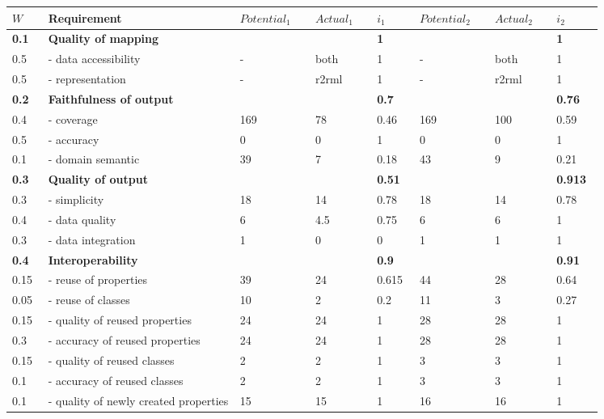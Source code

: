 \documentclass[PhD, Submit, ngerman,UKenglish,table]{scrbook}
\begin{document}
\begin{table}[!ht]
\centering
\setlength{\tabcolsep}{4pt}
\begin{tabular}{p{0.05\linewidth}|p{0.28\linewidth}|p{0.11\linewidth}|p{0.09\linewidth}|p{0.06\linewidth}|p{0.11\linewidth}|p{0.09\linewidth}|p{0.06\linewidth}}

\textbf{$W$}  &\textbf{Requirement} & \textbf{$Potential_1$} & \textbf{$Actual_1$} & \textbf{$i_1$} & \textbf{$Potential_2$} & \textbf{$Actual_2$} & \textbf{$i_2$} \\
\toprule

\rowcolor[gray]{.9}
\textbf{0.1} & \multicolumn{3}{l|}{\textbf{Quality of mapping}} &\textbf{1} & & & \textbf{1}\\

0.5 & - data accessibility & - & both & 1  & - & both & 1  \\
0.5 & - representation & - & \gls{r2rml} & 1  & - & \gls{r2rml} & 1 \\

\rowcolor[gray]{.9}
\textbf{0.2} & \multicolumn{3}{l|}{\textbf{Faithfulness of output}} &  \textbf{0.7}  & & & \textbf{0.76} \\

0.4 & \colorbox{gray!50}{- coverage} & 169 & 78 & \colorbox{gray!50}{0.46}  & 169 & 100 & 0.59 \\
0.5 & - accuracy & 0 & 0 &  1  &  0 & 0 & 1 \\
0.1 & - domain semantic & 39 & 7 & 0.18   & 43 & 9 & 0.21 \\

\rowcolor[gray]{.9}
\textbf{0.3} & \multicolumn{3}{l|}{\textbf{Quality of output}} &  \textbf{0.51}  & & & \textbf{0.913} \\

0.3 & - simplicity & 18  & 14 &  0.78  & 18 & 14 & 0.78  \\
0.4 & \colorbox{gray!50}{- data quality} & 6  & 4.5 &  \colorbox{gray!50}{0.75}  & 6 & 6 & 1  \\
0.3 & \colorbox{gray!50}{- data integration} & 1 & 0 &  \colorbox{gray!50}{0}  & 1 & 1 & 1 \\

\rowcolor[gray]{.9}
\textbf{0.4} & \multicolumn{3}{l|}{\textbf{Interoperability}} &  \textbf{0.9}   & & & \textbf{0.91} \\

0.15 & - reuse of properties & 39 & 24 &  0.615  & 44 & 28 & 0.64\\
0.05 & - reuse of classes & 10 & 2 &  0.2  & 11 & 3 & 0.27\\
0.15 & - quality of reused properties & 24 & 24 &  1   & 28 & 28 & 1 \\
0.3 & - accuracy of reused properties & 24 & 24 &  1  &  28 & 28 & 1 \\
0.15 & - quality of reused classes & 2 & 2 &  1   &  3 &3 & 1 \\
0.1 & - accuracy of reused classes & 2 & 2 &  1  & 3 & 3 &1 \\
0.1 & - quality of newly created properties & 15 & 15 &  1   & 16 & 16 &1 \\




\end{tabular}
\end{table}
\end{document}
